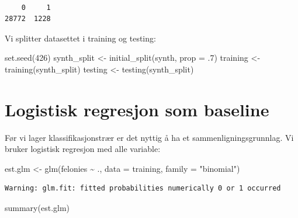 \documentclass[
  letterpaper,
  DIV=11,
  numbers=noendperiod]{scrreprt}
\newenvironment{Shaded}{\begin{snugshade}}{\end{snugshade}}
\newcommand{\AttributeTok}[1]{\textcolor[rgb]{0.40,0.45,0.13}{#1}}
\newcommand{\DecValTok}[1]{\textcolor[rgb]{0.68,0.00,0.00}{#1}}
\newcommand{\FunctionTok}[1]{\textcolor[rgb]{0.28,0.35,0.67}{#1}}
\newcommand{\NormalTok}[1]{\textcolor[rgb]{0.00,0.23,0.31}{#1}}
\newcommand{\OtherTok}[1]{\textcolor[rgb]{0.00,0.23,0.31}{#1}}
\newcommand{\SpecialCharTok}[1]{\textcolor[rgb]{0.37,0.37,0.37}{#1}}
\newcommand{\StringTok}[1]{\textcolor[rgb]{0.13,0.47,0.30}{#1}}
\begin{document}
\begin{verbatim}

    0     1 
28772  1228 
\end{verbatim}

Vi splitter datasettet i training og testing:

\begin{Shaded}
\begin{Highlighting}[]
\FunctionTok{set.seed}\NormalTok{(}\DecValTok{426}\NormalTok{)}
\NormalTok{synth\_split }\OtherTok{\textless{}{-}} \FunctionTok{initial\_split}\NormalTok{(synth, }\AttributeTok{prop =}\NormalTok{ .}\DecValTok{7}\NormalTok{)}
\NormalTok{training }\OtherTok{\textless{}{-}} \FunctionTok{training}\NormalTok{(synth\_split)}
\NormalTok{testing  }\OtherTok{\textless{}{-}} \FunctionTok{testing}\NormalTok{(synth\_split)}
\end{Highlighting}
\end{Shaded}

\section{Logistisk regresjon som
baseline}\label{logistisk-regresjon-som-baseline}

Før vi lager klassifikasjonstrær er det nyttig å ha et
sammenligningsgrunnlag. Vi bruker logistisk regresjon med alle variable:

\begin{Shaded}
\begin{Highlighting}[]
\NormalTok{est.glm }\OtherTok{\textless{}{-}} \FunctionTok{glm}\NormalTok{(felonies }\SpecialCharTok{\textasciitilde{}}\NormalTok{ ., }\AttributeTok{data =}\NormalTok{ training, }\AttributeTok{family =} \StringTok{"binomial"}\NormalTok{)}
\end{Highlighting}
\end{Shaded}

\begin{verbatim}
Warning: glm.fit: fitted probabilities numerically 0 or 1 occurred
\end{verbatim}

\begin{Shaded}
\begin{Highlighting}[]
\FunctionTok{summary}\NormalTok{(est.glm)}
\end{Highlighting}
\end{Shaded}
\end{document}
